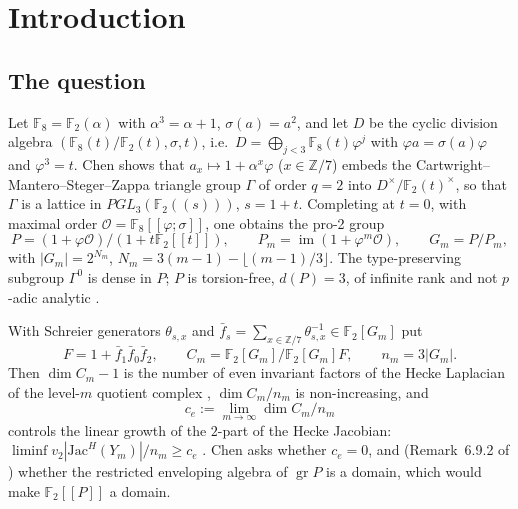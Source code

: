 \documentclass[11pt]{amsart}
\theoremstyle{definition}
\newcommand{\F}{\mathbb{F}}
\newcommand{\Z}{\mathbb{Z}}
\newcommand{\gr}{\operatorname{gr}}
\begin{document}
\section{Introduction}

\subsection{The question}
Let $\F_8=\F_2(\alpha)$ with $\alpha^3=\alpha+1$, $\sigma(a)=a^2$, and let $D$ be the cyclic division algebra
$(\F_8(t)/\F_2(t),\sigma,t)$, i.e.\ $D=\bigoplus_{j<3}\F_8(t)\varphi^j$ with $\varphi a=\sigma(a)\varphi$ and
$\varphi^3=t$. Chen \cite[Thm.~6.4.1]{ChenIII} shows that $a_x\mapsto 1+\alpha^x\varphi$ ($x\in\Z/7$) embeds the
Cartwright--Mantero--Steger--Zappa triangle group $\Gamma$ of order $q=2$ \cite{CMSZ} into $D^\times/\F_2(t)^\times$,
so that $\Gamma$ is a lattice in $PGL_3(\F_2((s)))$, $s=1+t$. Completing at $t=0$, with maximal order
$\mathcal O=\F_8[[\varphi;\sigma]]$, one obtains the pro-2 group
\[
  P=(1+\varphi\mathcal O)/(1+t\F_2[[t]]),\qquad P_m=\operatorname{im}(1+\varphi^m\mathcal O),\qquad G_m=P/P_m ,
\]
with $|G_m|=2^{N_m}$, $N_m=3(m-1)-\lfloor (m-1)/3\rfloor$. The type-preserving subgroup $\Gamma^0$ is dense in $P$;
$P$ is torsion-free, $d(P)=3$, of infinite rank and not $p$-adic analytic \cite[Thm.~6.4.2]{ChenIII}.

With Schreier generators $\theta_{s,x}$ and $\bar f_s=\sum_{x\in\Z/7}\theta_{s,x}^{-1}\in\F_2[G_m]$ put
\[
  F=1+\bar f_1\bar f_0\bar f_2,\qquad C_m=\F_2[G_m]/\F_2[G_m]F,\qquad n_m=3|G_m| .
\]
Then $\dim C_m-1$ is the number of even invariant factors of the Hecke Laplacian of the level-$m$ quotient
complex \cite[Prop.~6.8.3]{ChenIII}, $\dim C_m/n_m$ is non-increasing, and
\[
  c_e:=\lim_{m\to\infty}\dim C_m/n_m
\]
controls the linear growth of the $2$-part of the Hecke Jacobian: $\liminf v_2|\mathrm{Jac}^H(Y_m)|/n_m\ge c_e$
\cite[Thm.~6.8.8]{ChenIII}. Chen asks whether $c_e=0$, and (Remark~6.9.2 of \cite{ChenIII}) whether the
restricted enveloping algebra of $\gr P$ is a domain, which would make $\F_2[[P]]$ a domain.
\end{document}
